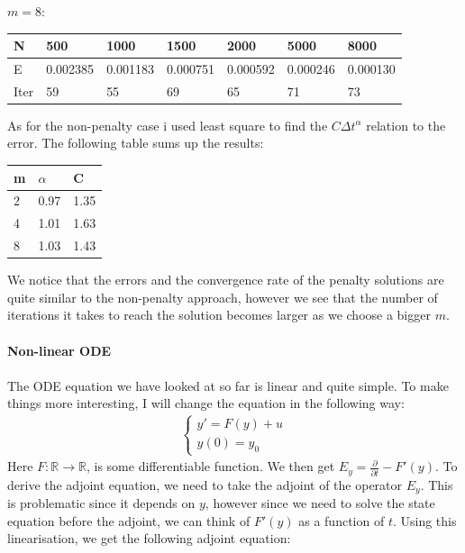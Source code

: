 \documentclass[11pt,a4paper]{article}
\begin{document}
$m=8$:
\begin{center}
    \begin{tabular}{| l | l | l | l | l | l | l |}
    \hline
    N & 500 & 1000  & 1500 & 2000 & 5000 & 8000 \\ \hline
    E & 0.002385 & 0.001183 &0.000751 & 0.000592 & 0.000246 & 0.000130	\\ \hline
    Iter & 59 & 55  & 69 & 65 & 71 & 73 \\ \hline
    \end{tabular}
\end{center}
As for the non-penalty case i used least square to find the $C\Delta t^{\alpha}$ relation to the error. The following table sums up the results:
\begin{center}
    \begin{tabular}{| l | l | l |}
    \hline
    m & $\alpha$ & C \\ \hline
    2 &0.97 &1.35 \\ \hline
    4 & 1.01&1.63 \\ \hline
    8 & 1.03&1.43 \\ \hline
    \end{tabular}
\end{center}
We notice that the errors and the convergence rate of the penalty solutions are quite similar to the non-penalty approach, however we see that the number of iterations it takes to reach the solution becomes larger as we choose a bigger $m$. 
\\
\\
\textbf{Non-linear ODE}
\\
\\
The ODE equation we have looked at so far is linear and quite simple. To make things more interesting, I will change the equation in the following way:
 \begin{align*}
\left\{
     \begin{array}{lr}
       	y'= F(y) +u\\
       	   y(0)=y_0
     \end{array}
   \right.
\end{align*} 
Here $F:\mathbb{R} \rightarrow \mathbb{R}$, is some differentiable function. We then get $E_y = \frac{\partial}{\partial t} - F'(y)$. To derive the adjoint equation, we need to take the adjoint of the operator $E_y$. This is problematic since it depends on $y$, however since we need to solve the state equation before the adjoint, we can think of $F'(y)$ as a function of $t$. Using this linearisation, we get the following adjoint equation: 
\end{document}
